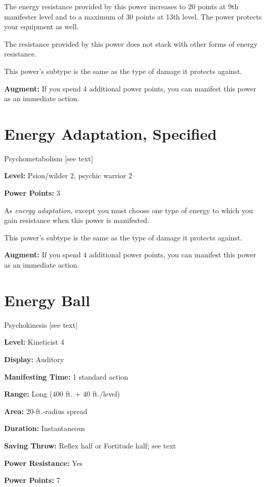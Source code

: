 \documentclass{article}
\begin{document}
The energy resistance provided by this power increases to 20 points at 9th manifester 
level and to a maximum of 30 points at 13th level. The power protects your equipment 
as well.

The resistance provided by this power does not stack with other forms of energy 
resistance.

This power's subtype is the same as the type of damage it protects against.

\textbf{Augment:} If you spend 4 additional power points, you can manifest this 
power as an immediate action.

\vspace{12pt}
\section*{Energy Adaptation, Specified}

Psychometabolism [see text]

\textbf{Level:} Psion/wilder 2, psychic warrior 2

\textbf{Power Points:} 3

As \textit{energy adaptation, }except you must choose one type of energy to which 
you gain resistance when this power is manifested.

This power's subtype is the same as the type of damage it protects against.

\textbf{Augment:} If you spend 4 additional power points, you can manifest this 
power as an immediate action.

\vspace{12pt}
\section*{Energy Ball}

Psychokinesis [see text]

\textbf{Level:} Kineticist 4

\textbf{Display:} Auditory

\textbf{Manifesting Time:} 1 standard action

\textbf{Range:} Long (400 ft. + 40 ft./level)

\textbf{Area:} 20-ft.-radius spread

\textbf{Duration:} Instantaneous

\textbf{Saving Throw:} Reflex half or Fortitude half; see text

\textbf{Power Resistance:} Yes

\textbf{Power Points:} 7
\end{document}
